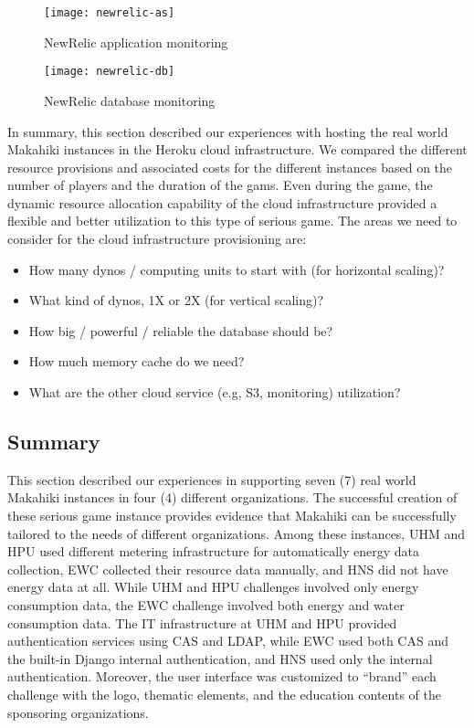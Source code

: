 \begin{figure}[ht!]
  \center
  \texttt{[image: newrelic-as]}
  \caption{NewRelic application monitoring}
  \label{fig:newrelic-as}
\end{figure}

\begin{figure}[ht!]
  \center
  \texttt{[image: newrelic-db]}
  \caption{NewRelic database monitoring}
  \label{fig:newrelic-db}
\end{figure}

In summary, this section described our experiences with hosting the real world Makahiki instances in the Heroku cloud infrastructure. We compared the different resource provisions and associated costs for the different instances based on the number of players and the duration of the gams. Even during the game, the dynamic resource allocation capability of the cloud infrastructure provided a flexible and better utilization to this type of serious game. The areas we need to consider for the cloud infrastructure provisioning are:
\begin{itemize}
\item How many dynos / computing units to start with (for horizontal scaling)?
\item What kind of dynos, 1X or 2X (for vertical scaling)? 
\item How big / powerful / reliable the database should be? 
\item How much memory cache do we need?
\item What are the other cloud service (e.g, S3, monitoring) utilization?
\end{itemize}

\subsection{Summary}

This section described our experiences in supporting seven (7) real world Makahiki instances in four (4) different organizations. The successful creation of these serious game instance provides evidence that Makahiki can be successfully tailored to the needs of different organizations. Among these instances, UHM and HPU used different metering infrastructure for automatically energy data collection, EWC collected their resource data manually, and HNS did not have energy data at all. While UHM and HPU challenges involved only energy consumption data, the EWC challenge involved both energy and water consumption data. The IT infrastructure at UHM and HPU provided authentication services using CAS and LDAP, while EWC used both CAS and the built-in Django internal  authentication, and HNS used only the internal authentication. Moreover, the user interface was customized to ``brand'' each challenge with the logo, thematic elements, and the education contents of the sponsoring organizations.

